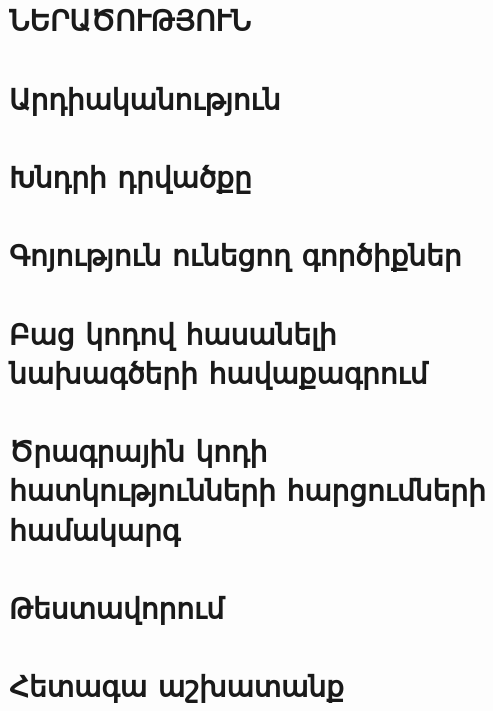\documentclass[a4paper, 12pt]{report}
\begin{document}
    

    \setcounter{page}{2}
    \setcounter{tocdepth}{3}
    \setcounter{secnumdepth}{3}

    

    

    \newpage
    \begin{center}
        \tableofcontents
    \end{center}

    \clearpage

    \section*{\textbf{ՆԵՐԱԾՈՒԹՅՈՒՆ}}
    


    \section{Արդիականություն}
    


    \section{Խնդրի դրվածքը}
    


    \section{Գոյություն ունեցող գործիքներ}
    


    \section{Բաց կոդով հասանելի նախագծերի հավաքագրում}


    \section{Ծրագրային կոդի հատկությունների հարցումների համակարգ}
    


    \section{Թեստավորում}
    


    \section{Հետագա աշխատանք}
    
\end{document}
